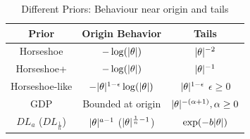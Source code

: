 \documentclass[11pt]{article}
\numberwithin{equation}{section}
\begin{document}
\begin{table}%
\centering
\begin{tabular}{| c | c |c |}
\hline
Prior & Origin Behavior & Tails \\
\hline 
Horseshoe & $-\log(\lvert\theta\rvert)$ & $\lvert\theta\rvert^{-2}$ \\
Horseshoe+ & $-\log(\lvert\theta\rvert)$ & $\lvert\theta\rvert^{-1}$ \\
Horseshoe-like & $-\lvert\theta\rvert^{1-\epsilon}\log(\lvert\theta\rvert)$ & $\lvert\theta\rvert^{1-\epsilon}$ $\epsilon \ge 0$\\
GDP & Bounded at origin & $\lvert\theta\rvert^{-(\alpha + 1)}, \alpha \ge 0$ \\
$DL_{a}$ ($DL_{\frac{1}{n}}$) & $\lvert\theta\rvert^{a-1}$ ($\lvert\theta\rvert^{\frac{1}{n}-1}$) & $\exp(-b\lvert\theta\rvert)$ \\
\hline
\end{tabular}
\caption{Different Priors: Behaviour near origin and tails}
\label{tab:priors}
\end{table}
\end{document}

